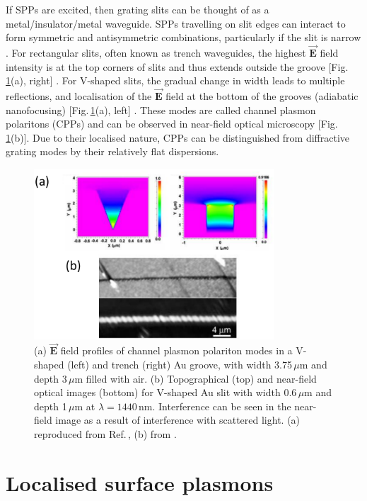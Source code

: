 If SPPs are excited, then grating slits can be thought of as a metal/insulator/metal waveguide. SPPs travelling on slit edges can interact to form symmetric and antisymmetric combinations, particularly if the slit is narrow \cite{Maier2007}. For rectangular slits, often known as trench waveguides, the highest $\vec{\mathbf{E}}$ field intensity is at the top corners of slits and thus extends outside the groove [Fig.\,\ref{3Fig6}(a), right] \cite{Bozhevolnyi2005, Srivastava2009, Chattopadhyay2012}. For V-shaped slits, the gradual change in width leads to multiple reflections, and localisation of the $\vec{\mathbf{E}}$ field at the bottom of the grooves (adiabatic nanofocusing) [Fig.\,\ref{3Fig6}(a), left] \cite{Bozhevolnyi2005, Srivastava2009, Novikov2002, Kuttge2009, Sondergaard2012}. These modes are called channel plasmon polaritons (CPPs) and can be observed in near-field optical microscopy [Fig.\,\ref{3Fig6}(b)]. Due to their localised nature, CPPs can be distinguished from diffractive grating modes by their relatively flat dispersions.
\begin{figure}[h!] 
\centering    
\includegraphics[width=0.8\textwidth]{Fig6}
\caption{(a) $\vec{\mathbf{E}}$ field profiles of channel plasmon polariton modes in a V-shaped (left) and trench (right) Au groove, with width 3.75\,$\mu$m and depth 3\,$\mu$m filled with air. (b) Topographical (top) and near-field optical images (bottom) for V-shaped Au slit with width 0.6\,$\mu$m and depth 1\,$\mu$m at $\lambda=1440$\,nm. Interference can be seen in the near-field image as a result of interference with scattered light. (a) reproduced from Ref.\,\cite{Srivastava2009}, (b) from \cite{Bozhevolnyi2005}.}
\label{3Fig6}
\end{figure} 

\section{Localised surface plasmons}
